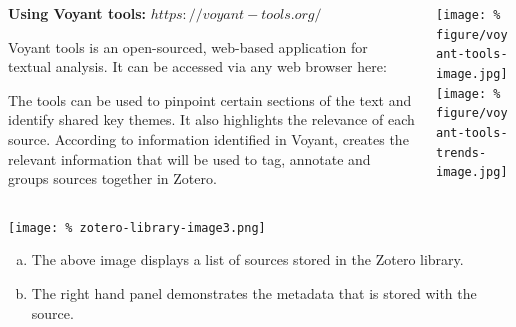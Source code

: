 \documentclass[unknownkeysallowed,usepdftitle=false, parskip=full]{beamer}
\newcommand{\secvariable}{nothing}
\newcommand{\mysection}[1]{\renewcommand{\secvariable}{#1}
}
\begin{document}
\begin{frame}\label{\secvariable}
  \begin{columns}[t]
    \begin{column}[c]{0.50\textwidth}
    \parbox{\linewidth}{

\textbf{Using Voyant tools:} $https://voyant-tools.org/$   
 
 Voyant tools is an open-sourced, web-based application for textual analysis. It can be accessed via any web browser here: 
      \vspace{8pt}
      
The tools can be used to pinpoint certain sections of the text and identify shared key themes. It also highlights the relevance of each source. According to information identified in Voyant, creates the relevant information that will be used to tag, annotate and groups sources together in Zotero. 	
      }
    \end{column}
    \begin{column}[c]{0.45\textwidth}
\texttt{[image: \%
figure/voyant-tools-image.jpg]}\\
\vspace{12pt}
\texttt{[image: \%
figure/voyant-tools-trends-image.jpg]}
    \end{column}
  \end{columns}

  
\end{frame}

\mysection{line}
\begin{frame}\label{\secvariable}
\begin{center}
  \vspace{-0.5cm}
 \texttt{[image: \%
  zotero-library-image3.png]}
\end{center}
  \vspace{-0.5cm}
  \begin{enumerate}[(a)]
  
  
  \item The above image displays a list of sources stored in the Zotero library.
  \item The right hand panel demonstrates the metadata that is stored with the source.
  \end{enumerate}

    
\end{frame}
\end{document}
